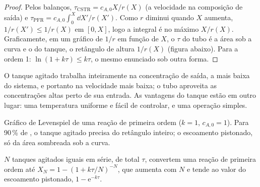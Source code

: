\begin{proof}
Pelos balanços, $\tau_{\text{CSTR}} = c_{A,0}X/r(X)$ (a velocidade na
composição de saída) e $\tau_{\text{PFR}} = c_{A,0}\int_0^X\dd X'/r(X')$. Como $r$
diminui quando $X$ aumenta, $1/r(X') \leq 1/r(X)$ em $[0, X]$, logo a
integral é no máximo $X/r(X)$. Graficamente, em um gráfico de $1/r$ em função
de $X$, o $\tau$ do tubo é a área sob a curva e o do tanque, o retângulo de
altura $1/r(X)$ (figura abaixo). Para a ordem 1: $\ln(1 + k\tau) \leq k\tau$,
o mesmo enunciado sob outra forma.
\end{proof}

O tanque agitado trabalha inteiramente na concentração de saída, a mais
baixa do sistema, e portanto na velocidade mais baixa; o tubo aproveita as
concentrações altas perto de sua entrada. As vantagens do tanque estão em
outro lugar: uma temperatura uniforme e fácil de controlar, e uma operação
simples.

\begin{omfigure}

{\small Gráfico de Levenspiel de uma reação de primeira ordem ($k = 1$, $c_{A,0} = 1$).
Para 90\,\% de , o tanque agitado precisa do retângulo inteiro; o
escoamento pistonado, só da área sombreada sob a curva.}
\end{omfigure}

\begin{proposition}\label{prop:b2:continuous-reactors:cascade}
$N$ tanques agitados iguais em série, de  total $\tau$,
convertem uma reação de primeira ordem até $X_N = 1 - (1 + k\tau/N)^{-N}$,
que aumenta com $N$ e tende ao valor do escoamento pistonado, $1 - \mathrm e^{-k\tau}$.
\end{proposition}

